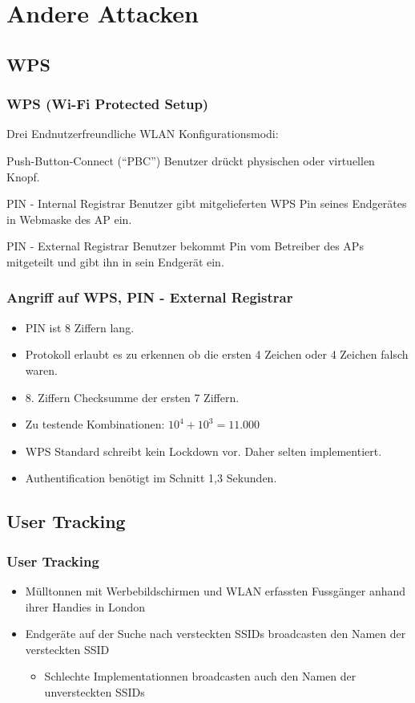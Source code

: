 \documentclass{beamer}
\begin{document}
\section{Andere Attacken}
\subsection{WPS}

\begin{frame}
\frametitle{WPS (Wi-Fi Protected Setup)}
Drei Endnutzerfreundliche WLAN Konfigurationsmodi:
\begin{block}{Push-Button-Connect (“PBC”)}
Benutzer drückt physischen oder virtuellen Knopf.
\end{block}
\begin{block}{PIN - Internal Registrar}
Benutzer gibt mitgelieferten WPS Pin seines Endgerätes in Webmaske des AP ein.
\end{block}
\begin{block}{PIN - External Registrar}
Benutzer bekommt Pin vom Betreiber des APs mitgeteilt und gibt ihn in sein Endgerät ein.
\end{block}
\end{frame}


\begin{frame}
\frametitle{Angriff auf WPS, PIN - External Registrar \cite{wps_attack}}
\begin{itemize}
	\item PIN ist 8 Ziffern lang.
	\item Protokoll erlaubt es zu erkennen ob die ersten 4 Zeichen oder 4 Zeichen falsch waren.
	\item 8. Ziffern Checksumme der ersten 7 Ziffern.
	\item Zu testende Kombinationen: $10^4+10^3 = 11.000$
	\item WPS Standard schreibt kein Lockdown vor. Daher selten implementiert.
	\item Authentification benötigt im Schnitt 1,3 Sekunden.
\end{itemize}
\end{frame}

\subsection{User Tracking}
\begin{frame}
\frametitle{User Tracking}
\begin{itemize}
	\item Mülltonnen mit Werbebildschirmen und WLAN erfassten Fussgänger anhand ihrer Handies in London \cite{mulltonnen}
	\item Endgeräte auf der Suche nach versteckten SSIDs broadcasten den Namen der versteckten SSID
	\begin{itemize}
		\item Schlechte Implementationnen broadcasten auch den Namen der unversteckten SSIDs
	\end{itemize}
\end{itemize}
\end{frame}
\end{document}
